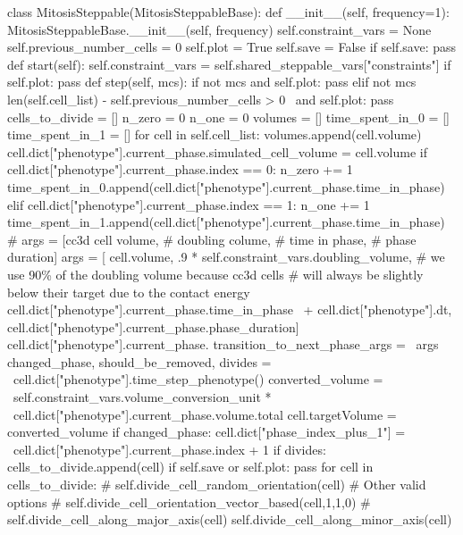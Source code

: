 \begin{python}
class MitosisSteppable(MitosisSteppableBase):
    def __init__(self, frequency=1):
        MitosisSteppableBase.__init__(self, frequency)
        self.constraint_vars = None
        self.previous_number_cells = 0
        self.plot = True
        self.save = False
        if self.save:
            pass
    def start(self):
        self.constraint_vars = self.shared_steppable_vars["constraints"]
        if self.plot:
            pass
    def step(self, mcs):
        if not mcs and self.plot:
            pass
        elif not mcs %
            len(self.cell_list) - self.previous_number_cells > 0 \
            and self.plot:
            pass
        cells_to_divide = []
        n_zero = 0
        n_one = 0
        volumes = []
        time_spent_in_0 = []
        time_spent_in_1 = []
        for cell in self.cell_list:
            volumes.append(cell.volume)
            cell.dict["phenotype"].current_phase.simulated_cell_volume = cell.volume
            if cell.dict["phenotype"].current_phase.index == 0:
                n_zero += 1
                time_spent_in_0.append(cell.dict["phenotype"].current_phase.time_in_phase)
            elif cell.dict["phenotype"].current_phase.index == 1:
                n_one += 1
                time_spent_in_1.append(cell.dict["phenotype"].current_phase.time_in_phase)
                # args = [cc3d cell volume, 
                #        doubling colume, 
                #        time in phase, 
                #        phase duration]
                args = [
                    cell.volume,
                    .9 * self.constraint_vars.doubling_volume,  
                    # we use 90\% of the doubling volume because cc3d cells
                    # will always be slightly below their target due to the contact energy
                    cell.dict["phenotype"].current_phase.time_in_phase \ 
                        + cell.dict["phenotype"].dt,
                    cell.dict["phenotype"].current_phase.phase_duration]
                cell.dict["phenotype"].current_phase.
                    transition_to_next_phase_args = \ 
                    args
            changed_phase, should_be_removed, divides = \ 
                cell.dict["phenotype"].time_step_phenotype()
            converted_volume = \ 
                self.constraint_vars.volume_conversion_unit * \
                    cell.dict["phenotype"].current_phase.volume.total
            cell.targetVolume = converted_volume
            if changed_phase:
                cell.dict["phase_index_plus_1"] = \ 
                    cell.dict["phenotype"].current_phase.index + 1
            if divides:
                cells_to_divide.append(cell)
        if self.save or self.plot:
            pass
        for cell in cells_to_divide:
            # self.divide_cell_random_orientation(cell)
            # Other valid options
            # self.divide_cell_orientation_vector_based(cell,1,1,0)
            # self.divide_cell_along_major_axis(cell)
            self.divide_cell_along_minor_axis(cell)


\end{python}
